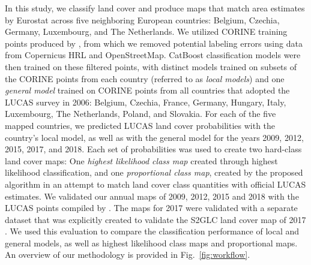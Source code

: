     In this study, we classify land cover and produce maps that match area estimates by Eurostat across five neighboring European countries: Belgium, Czechia, Germany, Luxembourg, and The Netherlands. We utilized CORINE training points produced by \citep{witjes2022spatiotemporal}, from which we removed potential labeling errors using data from Copernicus HRL and OpenStreetMap. CatBoost classification models were then trained on these filtered points, with distinct models trained on subsets of the CORINE points from each country (referred to as \emph{local models}) and one \emph{general model} trained on CORINE points from all countries that adopted the LUCAS survey in 2006: Belgium, Czechia, France, Germany, Hungary, Italy, Luxembourg, The Netherlands, Poland, and Slovakia. For each of the five mapped countries, we predicted LUCAS land cover probabilities with the country's local model, as well as with the general model for the years 2009, 2012, 2015, 2017, and 2018. Each set of probabilities was used to create two hard-class land cover maps: One \emph{highest likelihood class map} created through highest likelihood classification, and one \emph{proportional class map}, created by the proposed algorithm in an attempt to match land cover class quantities with official LUCAS estimates. We validated our annual maps of 2009, 2012, 2015 and 2018 with the LUCAS points compiled by \citep{dandrimont2020harmonised}. The maps for 2017 were validated with a separate dataset that was explicitly created to validate the S2GLC land cover map of 2017 \citep{jenerowicz2021validation}. We used this evaluation to compare the classification performance of local and  general models, as well as highest likelihood class maps and proportional maps. An overview of our methodology is provided in Fig.~\ref{fig:workflow}.

